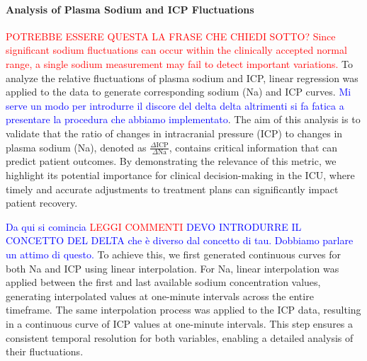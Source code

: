 \paragraph{Analysis of Plasma Sodium and ICP Fluctuations}
\textcolor{red}{POTREBBE ESSERE QUESTA LA FRASE CHE CHIEDI SOTTO? Since significant sodium fluctuations can occur within the clinically accepted normal range, a single sodium measurement may fail to detect  important variations.}
To analyze the relative fluctuations of plasma sodium and ICP, linear regression was applied to the data to generate corresponding sodium (Na) and ICP curves.
\textcolor{blue}{Mi serve un modo per introdurre il discore del delta delta altrimenti si fa fatica a presentare la procedura che abbiamo implementato}.
The aim of this analysis is to validate that the ratio of changes in intracranial pressure (ICP) to changes in plasma sodium (Na), denoted as \(\frac{\Delta \text{ICP}}{\Delta \text{Na}}\), contains critical information that can predict patient outcomes. By demonstrating the relevance of this metric, we highlight its potential importance for clinical decision-making in the ICU, where timely and accurate adjustments to treatment plans can significantly impact patient recovery.

\textcolor{blue}{Da qui si comincia} \textcolor{red}{LEGGI COMMENTI}
\textcolor{blue}{DEVO INTRODURRE IL CONCETTO DEL DELTA che è diverso dal concetto di tau. Dobbiamo parlare un attimo di questo. }
To achieve this, we first generated continuous curves for both Na and ICP using linear interpolation. For Na, linear interpolation was applied between the first and last available sodium concentration values, generating interpolated values at one-minute intervals across the entire timeframe. The same interpolation process was applied to the ICP data, resulting in a continuous curve of ICP values at one-minute intervals. This step ensures a consistent temporal resolution for both variables, enabling a detailed analysis of their fluctuations.

